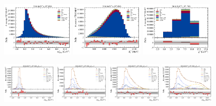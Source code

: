 \begin{figure}[htb]
    \centering
    \includegraphics[width=0.32\textwidth]{./figs-fit-fit-results/sig-fit/stacked/fit_result-stacked-D0-iso-mmiss2.pdf}
    \includegraphics[width=0.32\textwidth]{./figs-fit-fit-results/sig-fit/stacked/fit_result-stacked-D0-iso-el.pdf}
    \includegraphics[width=0.32\textwidth]{./figs-fit-fit-results/sig-fit/stacked/fit_result-stacked-D0-iso-q2.pdf}

    \includegraphics[width=0.24\textwidth]{./figs-fit-fit-results/sig-fit/lines_q2_slices/fit_result-lines_q2_idx1-D0-iso-mmiss2.pdf}
    \includegraphics[width=0.24\textwidth]{./figs-fit-fit-results/sig-fit/lines_q2_slices/fit_result-lines_q2_idx2-D0-iso-mmiss2.pdf}
    \includegraphics[width=0.24\textwidth]{./figs-fit-fit-results/sig-fit/lines_q2_slices/fit_result-lines_q2_idx3-D0-iso-mmiss2.pdf}
    \includegraphics[width=0.24\textwidth]{./figs-fit-fit-results/sig-fit/lines_q2_slices/fit_result-lines_q2_idx4-D0-iso-mmiss2.pdf}


\end{figure}
